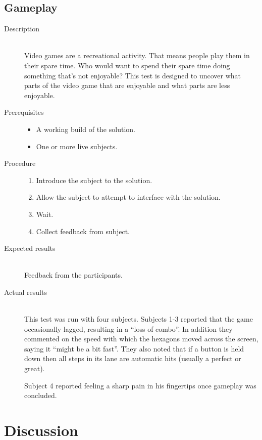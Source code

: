\subsection{Gameplay}
	\begin{description}
		\item[Description] \hfill \\
			Video games are a recreational activity.
			That means people play them in their spare time.
			Who would want to spend their spare time doing something that's not enjoyable?
			This test is designed to uncover what parts of the video game that are enjoyable and what parts are less enjoyable.
		\item[Prerequisites] \hfill
			\begin{itemize}
				\item{A working build of the solution.}
				\item{One or more live subjects.}
			\end{itemize}
		\item[Procedure] \hfill
			\begin{enumerate}
				\item{Introduce the subject to the solution.}
				\item{Allow the subject to attempt to interface with the solution.}
				\item{Wait.}
				\item{Collect feedback from subject.}
			\end{enumerate}
		\item[Expected results] \hfill \\
			Feedback from the participants.
		\item[Actual results] \hfill \\
			This test was run with four subjects.
			Subjects 1-3 reported that the game occasionally lagged, resulting in a ``loss of combo''.
			In addition they commented on the speed with which the hexagons moved across the screen, saying it ``might be a bit fast''.
			They also noted that if a button is held down then all steps in its lane are automatic hits (usually a perfect or great).

			Subject 4 reported feeling a sharp pain in his fingertips once gameplay was concluded.
	\end{description}


\section{Discussion}

